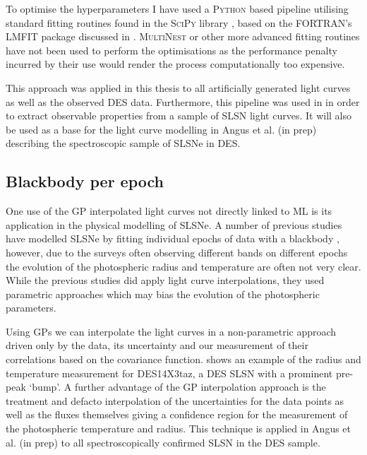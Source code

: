 To optimise the hyperparameters I have used a \textsc{Python} based pipeline utilising standard fitting routines found in the \textsc{SciPy} library \citep{Oliphant2007}, based on the \textsc{FORTRAN}'s \textsc{LMFIT} package discussed in . \textsc{MultiNest} or other more advanced fitting routines have not been used to perform the optimisations as the performance penalty incurred by their use would render the process computationally too expensive.

This approach was applied in this thesis to all artificially generated light curves as well as the observed DES data. Furthermore, this pipeline was used in \citet{Inserra2018} in order to extract observable properties from a sample of SLSN light curves. It will also be used as a base for the light curve modelling in Angus et al. (in prep) describing the spectroscopic sample of SLSNe in DES.

\subsection{Blackbody per epoch}
One use of the GP interpolated light curves not directly linked to ML is its application in the physical modelling of SLSNe. A number of previous studies have modelled SLSNe by fitting individual epochs of data with a blackbody \citep{Howell2013,Papadopoulos2015,Smith2016,Nicholl2017}, however, due to the surveys often observing different bands on different epochs the evolution of the photospheric radius and temperature are often not very clear. While the previous studies did apply light curve interpolations, they used parametric approaches which may bias the evolution of the photospheric parameters.

Using GPs we can interpolate the light curves in a non-parametric approach driven only by the data, its uncertainty and our measurement of their correlations based on the covariance function.  shows an example of the radius and temperature measurement for DES14X3taz, a DES SLSN with a prominent pre-peak `bump'. A further advantage of the GP interpolation approach is the treatment and defacto interpolation of the uncertainties for the data points as well as the fluxes themselves giving a confidence region for the measurement of the photospheric temperature and radius. This technique is applied in Angus et al. (in prep) to all spectroscopically confirmed SLSN in the DES sample.

